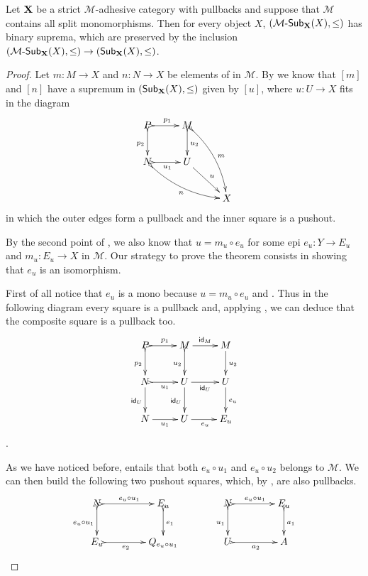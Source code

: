  \begin{theorem}\label{thm:un}Let $\textbf {\textup{X}}$ be a strict $\mathcal{M}$-adhesive category with pullbacks and suppose that $\mathcal{M}$ contains all split monomorphisms. Then for every object $X$, $({\mathcal{M}}\textrm{-}\mathsf{Sub}_{\textbf {\textup{X}}}(X), \leq)$ has binary suprema, which are preserved by the inclusion $({\mathcal{M}}\textrm{-}\mathsf{Sub}_{\textbf {\textup{X}}}(X), \leq)\to (\mathsf{Sub}_{\textbf {\textup{X}}}(X), \leq)$.
 \end{theorem}
\begin{proof}	Let $m\colon M\to X$  and $n\colon N\to X$ be elements of in $\mathcal{M}$. By  we know that $[m]$ and $[n]$  have a supremum in $(\mathsf{Sub}_{\textbf {\textup{X}}}(X), \leq)$ given by $[u]$, where $u\colon U\to X$ fits in the  diagram
	\[\xymatrix{P \ar@{>->}[r]^{p_1} \ar@{>->}[d]_{p_2} & M\ar@{>->}[d]^{u_2} \ar@{>->}@/^.3cm/[ddr]^{m} \\ N \ar@{>->}@/_.3cm/[drr]_{n}\ar@{>->}[r]_{u_1} & U \ar[dr]^{u} \\ && X}\]
	in which the outer edges form a pullback and the inner square is a pushout.  
	
	 By the second point of , we also know that $u=m_u\circ e_u$ for some epi $e_u\colon Y\to E_u$ and $m_u\colon E_u\to X$ in $\mathcal{M}$. Our strategy to prove the theorem consists in showing that $e_u$ is an isomorphism.
	 

	First of all notice that $e_u$ is a mono because $u=m_u\circ e_u$ and . Thus in the following diagram every square is a pullback and, applying , we can deduce that the composite square is a pullback too.
	\[\xymatrix{P \ar@{>->}[r]^{p_1} \ar@{>->}[d]_{p_2}& M \ar[r]^{\id{M}} \ar@{>->}[d]_{u_2} & M \ar[d]^{u_2} \\ N \ar@{>->}[r]_{u_1}  \ar[d]_{\id{U}}& U \ar[r]_{\id{U}} \ar[d]_{\id{U}} & U \ar[d]^{e_u} \\ N  \ar[r]_{u_1}& U \ar[r]_{e_u} & E_u}\].
	
	 As we have noticed before,  entails that both $e_u\circ u_1$ and $e_u\circ u_2$ belongs to $\mathcal{M}$. We can then build the following two pushout squares, which, by , are also pullbacks.
	\[\xymatrix@C=40pt{N \ar@{>->}[r]^-{e_u\circ u_1} \ar@{>->}[d]_{e_u\circ u_1} & E_u \ar@{>->}[d]^{e_1} & N \ar@{>->}[r]^-{e_u\circ u_1} \ar@{>->}[d]_{ u_1} & E_u \ar@{>->}[d]^{a_1} \\ E_u   \ar@{>->}[r]_-{e_2} & Q_{e_u\circ u_1} & U \ar@{>->}[r]_{a_2}& A}\]
	

\end{proof}
